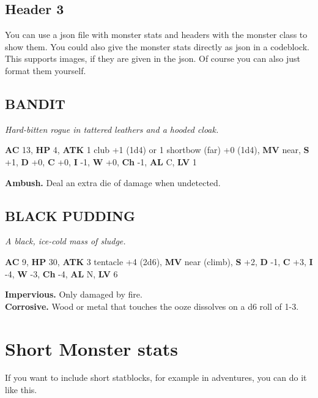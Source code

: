 \documentclass[
  10pt,
  titlepage=firstiscover,
  toc=flat,
  twoside]{scrreprt}
\begin{document}
{\begin{multicols}{2}

\subsection{Header 3}\label{header-3}

You can use a json file with monster stats and headers with the monster
class to show them. You could also give the monster stats directly as
json in a codeblock. This supports images, if they are given in the
json. Of course you can also just format them yourself.

\subsection{BANDIT}\label{bandit}

\emph{Hard-bitten rogue in tattered leathers and a hooded cloak.}

\textbf{AC} 13, \textbf{HP} 4, \textbf{ATK} 1 club +1 (1d4) or 1 shortbow (far) +0 (1d4), \textbf{MV} near, \textbf{S} +1, \textbf{D} +0, \textbf{C} +0, \textbf{I} -1, \textbf{W} +0, \textbf{Ch} -1, \textbf{AL} C, \textbf{LV} 1

\textbf{Ambush. }Deal an extra die of damage when undetected.

\subsection{BLACK PUDDING}\label{black-pudding}

\emph{A black, ice-cold mass of sludge.}

\textbf{AC} 9, \textbf{HP} 30, \textbf{ATK} 3 tentacle +4 (2d6), \textbf{MV} near (climb), \textbf{S} +2, \textbf{D} -1, \textbf{C} +3, \textbf{I} -4, \textbf{W} -3, \textbf{Ch} -4, \textbf{AL} N, \textbf{LV} 6

\textbf{Impervious. }Only damaged by fire.\\
\textbf{Corrosive.
}Wood or metal that touches the ooze dissolves on a d6 roll of 1-3.

\end{multicols}
}

\section{Short Monster stats}\label{short-monster-stats}

If you want to include short statblocks, for example in adventures, you
can do it like this.
\end{document}
